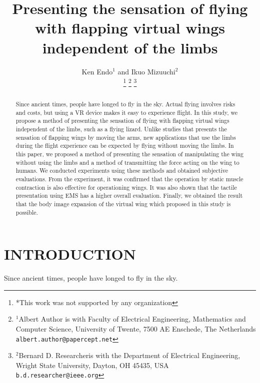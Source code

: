 \documentclass[letterpaper, 10 pt, conference]{ieeeconf}  %
\title{\LARGE \bf
        Presenting the sensation of flying with flapping virtual wings independent of the limbs
}
\author{Ken Endo$^{1}$ and Ikuo Mizuuchi$^{2}$%

        \thanks{*This work was not supported by any organization}%
        \thanks{$^{1}$Albert Author is with Faculty of Electrical Engineering, Mathematics and Computer Science,
                University of Twente, 7500 AE Enschede, The Netherlands
                {\tt\small albert.author@papercept.net}}%
        \thanks{$^{2}$Bernard D. Researcheris with the Department of Electrical Engineering, Wright State University,
                Dayton, OH 45435, USA
                {\tt\small b.d.researcher@ieee.org}}%
}
\begin{document}
\maketitle
\thispagestyle{empty}
\pagestyle{empty}


\begin{abstract}
        Since ancient times, people have longed to fly in the sky. 
        Actual flying involves risks and costs, but using a VR device makes it easy to experience flight. 
        In this study, we propose a method of presenting the sensation of flying with flapping virtual wings independent of the limbs, such as a flying lizard. 
        Unlike studies that presents the sensation of flapping wings by moving the arms, new applications that use the limbs during the flight experience can be expected by flying without moving the limbs. 
        In this paper, we proposed a method of presenting the sensation of manipulating the wing without using the limbs and a method of transmitting the force acting on the wing to humans. 
        We conducted experiments using these methods and obtained subjective evaluations.
        From the experiment, it was confirmed that the operation by static muscle contraction is also effective for operationing wings. 
        It was also shown that the tactile presentation using EMS has a higher overall evaluation. 
        Finally, we obtained the result that the body image expansion of the virtual wing which proposed in this study is possible.
\end{abstract}


\section{INTRODUCTION}



        Since ancient times, people have longed to fly in the sky. 
\end{document}
